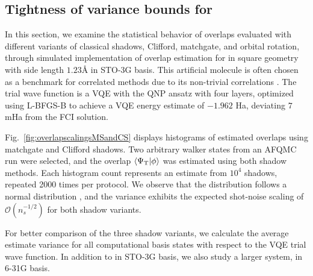 \documentclass[../main.tex]{subfiles}
\begin{document}
\subsection{Tightness of variance bounds for }

In this section, we examine the statistical behavior of overlaps evaluated with different variants of classical shadows, Clifford, matchgate, and orbital rotation, through simulated implementation of overlap estimation for  in square geometry with side length $1.23\text{\AA}$ in STO-3G basis. This artificial molecule is often chosen as a benchmark for correlated methods due to its non-trivial correlations \cite{huggins2022unbiasing, baek2023say}. The trial wave function is a VQE with the \ac{QNP} ansatz \cite{anselmetti2021local} with four layers, optimized using L-BFGS-B \cite{liu1989limited} to achieve a VQE energy estimate of $-1.962$ Ha, deviating $7$ mHa from the FCI solution.

Fig.~\ref{fig:overlapscalingsMSandCS} displays histograms of estimated overlaps using matchgate and Clifford shadows. Two arbitrary walker states from an AFQMC run were selected, and the overlap $\braket{\Psi_\mathrm{T}}{\phi}$ was estimated using both shadow methods. Each histogram count represents an estimate from $10^4$ shadows, repeated 2000 times per protocol. We observe that the distribution follows a normal distribution \cite{hadfield2020measurements}, and the variance exhibits the expected shot-noise scaling of $\mathcal{O}(n_s^{-1/2})$ for both shadow variants.

For better comparison of the three shadow variants, we calculate the average estimate variance for all computational basis states with respect to the VQE trial wave function. In addition to  in STO-3G basis, we also study a larger system,  in 6-31G basis.
\end{document}
